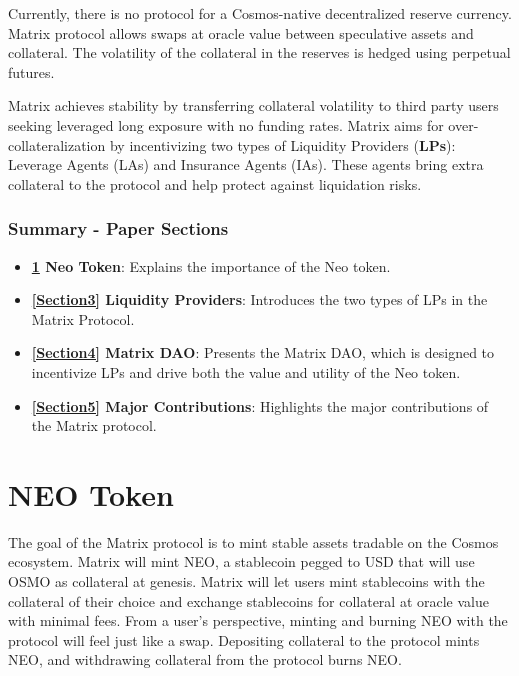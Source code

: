 \documentclass[%
 reprint,
nofootinbib,
 amsmath,amssymb,
 aps,
]{revtex4-2}
\begin{document}
Currently, there is no protocol for a Cosmos-native decentralized reserve currency. Matrix protocol allows swaps at oracle value between speculative assets and collateral. The volatility of the collateral in the reserves is hedged using perpetual futures. 

Matrix achieves stability by transferring collateral volatility to third party users seeking leveraged long exposure with no funding rates. Matrix aims for over-collateralization by incentivizing two types of Liquidity Providers (\textbf{LPs}): Leverage Agents (LAs) and Insurance Agents (IAs). These agents bring extra collateral to the protocol and help protect against liquidation risks.

\subsubsection*{Summary - Paper Sections} 
\begin{itemize}
  \item \textbf{\ref{Section2} Neo Token}: Explains the importance of the Neo token.
  \item \textbf{\ref{Section3} Liquidity Providers}: Introduces the two types of LPs in the Matrix Protocol.
  \item \textbf{\ref{Section4} Matrix DAO}: Presents the Matrix DAO, which is designed to incentivize LPs and drive both the value and utility of the Neo token.
  \item \textbf{\ref{Section5} Major Contributions}: Highlights the major contributions of the Matrix protocol.
\end{itemize}



\section{NEO Token}\label{Section2}

The goal of the Matrix protocol is to mint stable assets tradable on the Cosmos ecosystem. Matrix will mint NEO, a stablecoin pegged to USD that will use OSMO as collateral at genesis. Matrix will let users mint stablecoins with the collateral of their choice and exchange stablecoins for collateral at oracle value with minimal fees. From a user’s perspective, minting and burning NEO with the protocol will feel just like a swap. Depositing collateral to the protocol mints NEO, and withdrawing collateral from the protocol burns NEO.
\end{document}
